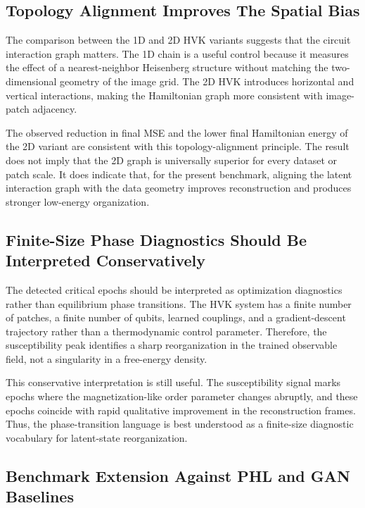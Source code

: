 \documentclass[11pt]{article}
\begin{document}
\subsection{Topology Alignment Improves The Spatial Bias}

The comparison between the 1D and 2D HVK variants suggests that the circuit interaction graph matters. The 1D chain is a useful control because it measures the effect of a nearest-neighbor Heisenberg structure without matching the two-dimensional geometry of the image grid. The 2D HVK introduces horizontal and vertical interactions, making the Hamiltonian graph more consistent with image-patch adjacency.

The observed reduction in final MSE and the lower final Hamiltonian energy of the 2D variant are consistent with this topology-alignment principle. The result does not imply that the 2D graph is universally superior for every dataset or patch scale. It does indicate that, for the present benchmark, aligning the latent interaction graph with the data geometry improves reconstruction and produces stronger low-energy organization.

\subsection{Finite-Size Phase Diagnostics Should Be Interpreted Conservatively}

The detected critical epochs should be interpreted as optimization diagnostics rather than equilibrium phase transitions. The HVK system has a finite number of patches, a finite number of qubits, learned couplings, and a gradient-descent trajectory rather than a thermodynamic control parameter. Therefore, the susceptibility peak identifies a sharp reorganization in the trained observable field, not a singularity in a free-energy density.

This conservative interpretation is still useful. The susceptibility signal marks epochs where the magnetization-like order parameter changes abruptly, and these epochs coincide with rapid qualitative improvement in the reconstruction frames. Thus, the phase-transition language is best understood as a finite-size diagnostic vocabulary for latent-state reorganization.

\subsection{Benchmark Extension Against PHL and GAN Baselines}
\end{document}
